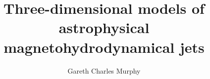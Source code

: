 \title{Three-dimensional models of astrophysical magnetohydrodynamical jets}
\author{Gareth Charles Murphy}
